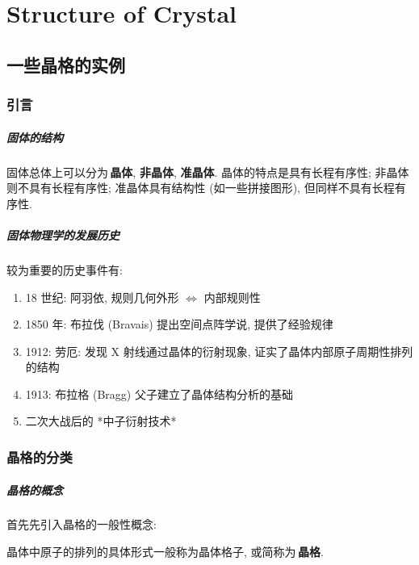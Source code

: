 \chapter{Structure of Crystal}
\section{一些晶格的实例}
    \subsection{引言}
        \paragraph{固体的结构 \\}
            \hspace*{2em} 固体总体上可以分为\,\textbf{晶体}, \textbf{非晶体}, \textbf{准晶体}. 晶体的特点是具有长程有序性; 非晶体则不具有长程有序性; 准晶体具有结构性 (如一些拼接图形), 但同样不具有长程有序性.

        \paragraph{固体物理学的发展历史 \\}
            \hspace*{2em} 较为重要的历史事件有:
                \begin{enumerate}
                    \item 18 世纪: 阿羽依, 规则几何外形 $\Leftrightarrow$ 内部规则性
                    \item 1850 年: 布拉伐 (Bravais) 提出空间点阵学说, 提供了经验规律
                    \item 1912: 劳厄: 发现 X 射线通过晶体的衍射现象, 证实了晶体内部原子周期性排列的结构
                    \item 1913: 布拉格 (Bragg) 父子建立了晶体结构分析的基础
                    \item 二次大战后的 *中子衍射技术*
                \end{enumerate}

    \subsection{晶格的分类}
        \paragraph{晶格的概念 \\}
            \hspace*{2em} 首先先引入晶格的一般性概念:
                \begin{Concept}[晶格]
                    晶体中原子的排列的具体形式一般称为晶体格子, 或简称为\,\textbf{晶格}.
                \end{Concept}

